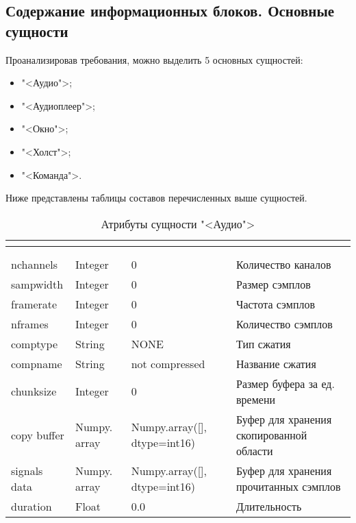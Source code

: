 \subsection{Содержание информационных блоков. Основные сущности}

Проанализировав требования, можно выделить 5 основных сущностей:
\begin{itemize}
	\item "<Аудио">;
	\item "<Аудиоплеер">;
	\item "<Окно">;
	\item "<Холст">;
	\item "<Команда">.
\end{itemize}

Ниже представлены таблицы составов перечисленных выше сущностей.

\begin{xltabular}{\textwidth}{|p{2.1cm}|p{2cm}|l|X|}
	\caption{Атрибуты сущности "<Аудио">}\\ \hline
	\label{news:table}
	 &  &  &  \\ \hline
	 &  &  &  \\ \hline
	\endfirsthead
	 &  &  &  \\ \hline
	\finishhead
	nchannels & Integer & 0 & Количество каналов \\ \hline 
	sampwidth & Integer & 0 & Размер сэмплов \\ \hline 
	framerate & Integer & 0 & Частота сэмплов \\ \hline 
	nframes & Integer & 0 & Количество сэмплов \\ \hline 
	comptype & String & NONE & Тип сжатия \\ \hline 
	compname & String & not compressed & Название сжатия \\ \hline 
	chunksize & Integer & 0 & Размер буфера за ед. времени \\ \hline 
	copy buffer & Numpy. array & Numpy.array([], dtype=int16) & Буфер для хранения скопированной области \\ \hline 
	signals data & Numpy. array & Numpy.array([], dtype=int16) & Буфер для хранения прочитанных сэмплов \\ \hline 
	duration & Float & 0.0 & Длительность
\end{xltabular}

